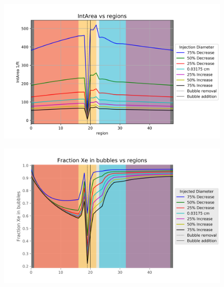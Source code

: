 \begin{figure}[p] 
\centering
\begin{minipage}{.5\textwidth}
  \centering
  \includegraphics[width=1.0\linewidth]{images/InjectedIntArea.png}
  \label{fig:InjectedIntAreaCon}
\end{minipage}%
\begin{minipage}{.5\textwidth}
  \centering
  \includegraphics[width=1.0\linewidth]{images/InjectedFractionXeInBubbles.png}
  \label{fig:InjectedFractionXeInBubbles}
\end{minipage}
\end{figure}

\newpage


